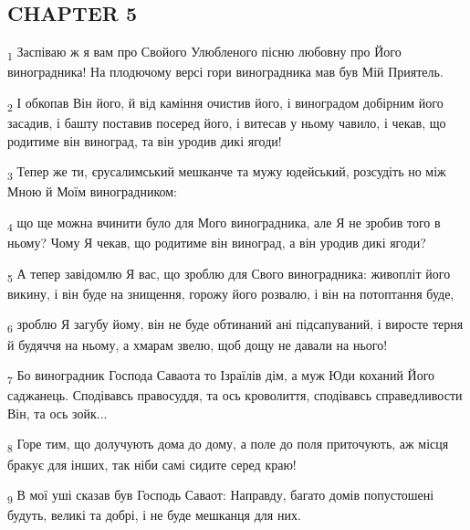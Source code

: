 \subsection{CHAPTER 5}
\begin{tcolorbox}
\textsubscript{1} Заспіваю ж я вам про Свойого Улюбленого пісню любовну про Його виноградника! На плодючому версі гори виноградника мав був Мій Приятель.
\end{tcolorbox}
\begin{tcolorbox}
\textsubscript{2} І обкопав Він його, й від каміння очистив його, і виноградом добірним його засадив, і башту поставив посеред його, і витесав у ньому чавило, і чекав, що родитиме він виноград, та він уродив дикі ягоди!
\end{tcolorbox}
\begin{tcolorbox}
\textsubscript{3} Тепер же ти, єрусалимський мешканче та мужу юдейський, розсудіть но між Мною й Моїм виноградником:
\end{tcolorbox}
\begin{tcolorbox}
\textsubscript{4} що ще можна вчинити було для Мого виноградника, але Я не зробив того в ньому? Чому Я чекав, що родитиме він виноград, а він уродив дикі ягоди?
\end{tcolorbox}
\begin{tcolorbox}
\textsubscript{5} А тепер завідомлю Я вас, що зроблю для Свого виноградника: живопліт його викину, і він буде на знищення, горожу його розвалю, і він на потоптання буде,
\end{tcolorbox}
\begin{tcolorbox}
\textsubscript{6} зроблю Я загубу йому, він не буде обтинаний ані підсапуваний, і виросте терня й будяччя на ньому, а хмарам звелю, щоб дощу не давали на нього!
\end{tcolorbox}
\begin{tcolorbox}
\textsubscript{7} Бо виноградник Господа Саваота то Ізраїлів дім, а муж Юди коханий Його саджанець. Сподівавсь правосуддя, та ось кроволиття, сподівавсь справедливости Він, та ось зойк...
\end{tcolorbox}
\begin{tcolorbox}
\textsubscript{8} Горе тим, що долучують дома до дому, а поле до поля приточують, аж місця бракує для інших, так ніби самі сидите серед краю!
\end{tcolorbox}
\begin{tcolorbox}
\textsubscript{9} В мої уші сказав був Господь Саваот: Направду, багато домів попустошені будуть, великі та добрі, і не буде мешканця для них.
\end{tcolorbox}
